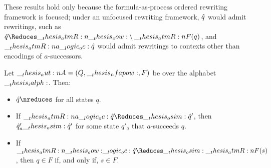 These results hold only because the formula-as-process ordered rewriting framework is focused;
under an unfocused rewriting framework, $\hat{q}$ would admit rewritings, such as $\defp{q} \Reduces \atmR{\eow} \limp \atmR{F}(q)$, and $\__thesis_atmR:n {a} \__logic_oc: \hat{q}$ would admit rewritings to contexts other than encodings of $a$-successors.


\begin{lemma}\label{lem:a-succ-bisim}\label{lem:nfa-latent}\label{lem:final-bisim}
  Let $\__thesis_aut:n {A} = (Q, \__thesis_nfapow:, F)$ be  over the alphabet $\__thesis_ialph:$.
  Then:
  \begin{itemize}[nosep]
  \item $\defp{q} \nreduces$ for all states $q$.
  \item If $\atmR{a} \oc \defp{q} \Reduces\osim \defp{q}'$, then $\hat{q}'_a \__thesis_osim: \hat{q}'$ for some state $q'_a$ that $a$-succeeds $q$.
  \item If $\atmR{\eow} \oc \defp{q} \Reduces\osim \atmR{F}(s)$, then $q \in F$ if, and only if, $s \in F$.
  \end{itemize}
\end{lemma}
